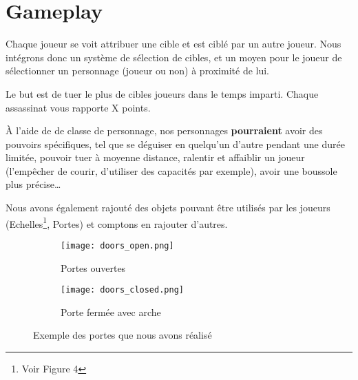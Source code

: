\documentclass[../doc.tex]{subfiles}
\begin{document}
\section{Gameplay}

Chaque joueur se voit attribuer une cible et est ciblé par un autre joueur.
Nous intégrons donc un système de sélection de cibles, et un moyen pour le joueur de sélectionner un personnage (joueur ou non) à proximité de lui.

Le but est de tuer le plus de cibles joueurs dans le temps imparti.
Chaque assassinat vous rapporte X points.

À l'aide de de classe de personnage, nos personnages \textbf{pourraient} avoir des pouvoirs spécifiques,
tel que se déguiser en quelqu'un d'autre pendant une durée limitée,
pouvoir tuer à moyenne distance, ralentir et affaiblir un joueur
(l'empêcher de courir, d'utiliser des capacités par exemple), avoir une boussole plus précise\dots


Nous avons également rajouté des objets pouvant être utilisés par les joueurs
(Echelles\footnote{Voir Figure 4}, Portes) et comptons en rajouter d'autres.
\begin{figure}[hbt!]
    \centering
    \begin{subfigure}[t]{0.3\textwidth}
        \texttt{[image: doors\_open.png]} 
        \caption{Portes ouvertes}
    \end{subfigure}
    \hspace{50pt}
    \begin{subfigure}[t]{0.3\textwidth}
        \texttt{[image: doors\_closed.png]}
        \caption{Porte fermée avec arche}
    \end{subfigure}
    \caption{Exemple des portes que nous avons réalisé}
\end{figure}
\end{document}

